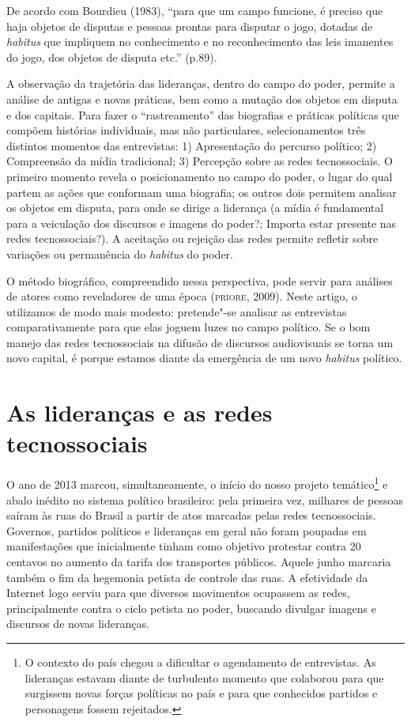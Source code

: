 De acordo com Bourdieu (1983), ``para que um campo funcione, é preciso
que haja objetos de disputas e pessoas prontas para disputar o jogo,
dotadas de \emph{habitus} que impliquem no conhecimento e no
reconhecimento das leis imanentes do jogo, dos objetos de disputa etc.''
(p.89).

A observação da trajetória das lideranças, dentro do campo do poder,
permite a análise de antigas e novas práticas, bem como a mutação dos
objetos em disputa e dos capitais. Para fazer o ``rastreamento'' das
biografias e práticas políticas que compõem histórias individuais, mas
não particulares, selecionamentos três distintos momentos das
entrevistas: 1) Apresentação do percurso político; 2) Compreensão da
mídia tradicional; 3) Percepção sobre as redes tecnossociais. O primeiro
momento revela o posicionamento no campo do poder, o lugar do qual
partem as ações que conformam uma biografia; os outros dois permitem
analisar os objetos em disputa, para onde se dirige a liderança (a mídia
é fundamental para a veiculação dos discursos e imagens do poder?;
Importa estar presente nas redes tecnossociais?). A aceitação ou
rejeição das redes permite refletir sobre variações ou permanência do
\emph{habitus} do poder.

O método biográfico, compreendido nessa perspectiva, pode servir para
análises de atores como reveladores de uma época (\textsc{priore}, 2009). Neste
artigo, o utilizamos de modo mais modesto: pretende"-se analisar as
entrevistas comparativamente para que elas joguem luzes no campo
político. Se o bom manejo das redes tecnossociais na difusão de
discursos audiovisuais se torna um novo capital, é porque estamos diante
da emergência de um novo \emph{habitus} político.

\section{As lideranças e as redes tecnossociais}

O ano de 2013 marcou, simultaneamente, o início do nosso projeto
temático\footnote{O contexto do país chegou a dificultar o agendamento
  de entrevistas. As lideranças estavam diante de turbulento momento que
  colaborou para que surgissem novas forças políticas no país e para que
  conhecidos partidos e personagens fossem rejeitados.} e abalo inédito
no sistema político brasileiro: pela primeira vez, milhares de pessoas
saíram às ruas do Brasil a partir de atos marcadas pelas redes
tecnossociais. Governos, partidos políticos e lideranças em geral não
foram poupadas em manifestações que inicialmente tinham como objetivo
protestar contra 20 centavos no aumento da tarifa dos transportes
públicos. Aquele junho marcaria também o fim da hegemonia petista de
controle das ruas. A efetividade da Internet logo serviu para que
diversos movimentos ocupassem as redes, principalmente contra o ciclo
petista no poder, buscando divulgar imagens e discursos de novas
lideranças.

